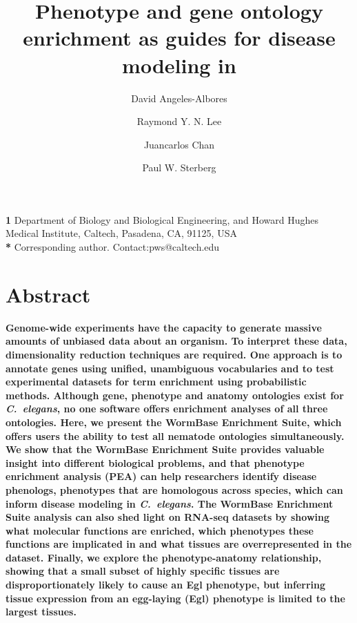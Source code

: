\documentclass[10pt, onecolumn]{article}
\title{
  \Large
  \textbf{
  Phenotype and gene ontology enrichment as guides for disease modeling
  in \cel{}
          }
}
\author[1,2]{David Angeles-Albores}
\author[1]{Raymond Y. N. Lee}
\author[1]{Juancarlos Chan}
\author[1,2,*]{Paul W. Sterberg}
\affil[1]{Division of Biology and Biological Engineering, Caltech,
Pasadena, CA, 91125, USA}
\affil[2]{Howard Hughes Medical Institute, Caltech, Pasadena, CA, 91125, USA}
\newcommand{\cel}{\emph{C.~elegans}}
\begin{document}

\maketitle

\textbf{1} Department of Biology and Biological Engineering,
and Howard Hughes Medical Institute, Caltech, Pasadena, CA, 91125, USA\\
\textbf{*} Corresponding author. Contact:pws@caltech.edu

\section*{Abstract}
\textbf{
Genome-wide experiments have the capacity to generate massive amounts of unbiased
data about an organism. To interpret these data, dimensionality reduction
techniques are required. One approach is to annotate genes using unified,
unambiguous vocabularies and to test experimental datasets for term enrichment
using probabilistic methods.
Although gene, phenotype and anatomy ontologies exist for \cel{}, no one
software offers enrichment analyses of all three ontologies.
Here, we present the WormBase Enrichment Suite, which offers users the
ability to test all nematode ontologies simultaneously. We show that
the WormBase Enrichment Suite provides valuable insight into different
biological problems, and that phenotype enrichment analysis (PEA) can
help researchers identify disease phenologs, phenotypes that are homologous across
species, which can inform disease modeling in \cel{}. The WormBase Enrichment Suite
analysis can also shed light on RNA-seq datasets by showing what
molecular functions are enriched, which phenotypes these functions are implicated
in and what tissues are overrepresented in the dataset. Finally, we explore the
phenotype-anatomy relationship, showing that a small subset of highly specific
tissues are disproportionately likely to cause an Egl phenotype, but inferring
tissue expression from an egg-laying (Egl) phenotype is limited to the largest tissues.
}

\vspace{10mm}

\nolinenumbers{}
\end{document}
